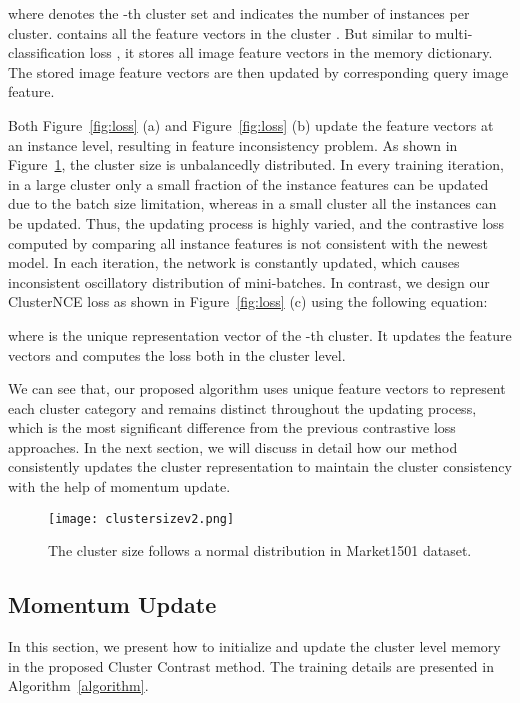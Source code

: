 where  denotes the -th cluster set and  indicates the number of instances per cluster. 
 contains all the feature vectors in the cluster .
But similar to multi-classification loss , it stores all image feature vectors in the memory dictionary. The stored image feature vectors are then updated by corresponding query image feature.

Both Figure~\ref{fig:loss} (a) and Figure~\ref{fig:loss} (b) update the feature vectors at an instance level, resulting in feature inconsistency problem.
As shown in Figure~\ref{fig:clustersize}, the cluster size is unbalancedly distributed.
In every training iteration, in a large cluster only a small fraction of the instance features can be updated due to the batch size limitation, whereas in a small cluster all the instances can be updated.
Thus, the updating process is highly varied, and the contrastive loss computed by comparing all instance features is not consistent with the newest model. In each iteration, the network is constantly updated, which causes inconsistent oscillatory distribution of mini-batches.
In contrast, we design our ClusterNCE loss as shown in Figure~\ref{fig:loss} (c) using the following equation:

where  is the unique representation vector of the -th cluster.
It updates the feature vectors and computes the loss both in the cluster level.

We can see that, our proposed algorithm uses unique feature vectors to represent each cluster category and remains distinct throughout the updating process, which is the most significant difference from the previous contrastive loss approaches.
In the next section, we will discuss in detail how our method consistently updates the cluster representation to maintain the cluster consistency with the help of momentum update.

\begin{figure}[t]
    \centering
    \texttt{[image: clustersizev2.png]}
    \caption{The cluster size follows a normal distribution in Market1501 dataset.}
    \label{fig:clustersize}
\end{figure}

\subsection {Momentum Update}
\label{sec:ClusterContrast}
In this section, we present how to initialize and update the cluster level memory in the proposed Cluster Contrast method. The training details are presented in Algorithm~\ref{algorithm}.

